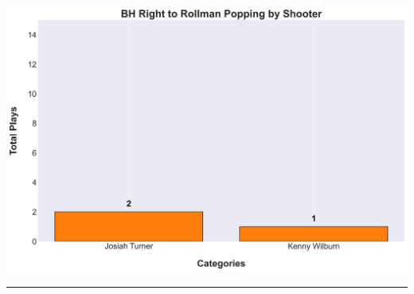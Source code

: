 \documentclass[a4paper,12pt]{article}
\begin{document}
\begin{table}[H]
{\begin{minipage}[t]{0.6\textwidth}
{\begin{tabular}
                
            
                
            
                
            
                
            
                
            
                
            
                
            
                
            
                
            

            \bottomrule
        \end{tabular}
        } %
    \end{minipage}
    } %
    \hfill %
    \begin{minipage}[c]{0.35\textwidth} %
        \flushright
        \includegraphics[width=\textwidth, height=.14\textheight]{images/PNR_PassRightPopsPlayer_Freq.png} %
    \end{minipage}
\end{table}

\vspace{-1em} %
\hrule height 1pt width 1\textwidth %
\vspace{1em} %

\clearpage

\end{document}
